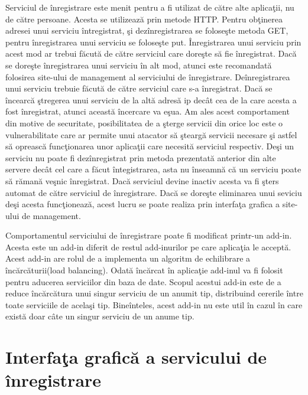 \documentclass[a4paper,12pt]{report}
\begin{document}
Serviciul de \^inregistrare este menit pentru a fi utilizat de c\u atre alte aplica\c tii, nu de c\u atre persoane.
Acesta se utilizeaz\u a prin metode HTTP. Pentru ob\c tinerea adresei unui serviciu \^intregistrat, \c si dez\^inregistrarea
 se folose\c ste metoda GET, pentru \^inregistrarea unui serviciu se folose\c ste put.
\^Inregistrarea unui serviciu prin acest mod ar trebui f\u acut\u a de c\u atre serviciul care dore\c ste 
s\u a fie \^inregistrat. Dac\u a se dore\c ste \^inregistrarea unui serviciu \^in alt mod, atunci este recomandat\u a 
folosirea site-ului de management al serviciului de \^inregistrare.
De\^inregistrarea unui serviciu trebuie f\u acut\u a de c\u atre serviciul care s-a \^inregistrat. Dac\u a 
se \^incearc\u a \c stregerea unui serviciu de la alt\u a adres\u a ip dec\^at cea de la care acesta a fost \^inregistrat,
atunci aceast\u a \^incercare va e\c sua. Am ales acest comportament din motive de securitate, posibilitatea de 
a \c sterge servicii din orice loc este o vulnerabilitate care ar permite unui atacator s\u a \c stearg\u a 
servicii necesare \c si astfel s\u a opreasc\u a func\c tionarea unor aplica\c tii care necesit\u a serviciul respectiv.
De\c si un serviciu nu poate fi dez\^inregistrat prin metoda prezentat\u a anterior din alte servere dec\^at cel care a 
f\u acut \^integistrarea, asta nu \^inseamn\u a c\u a un serviciu poate s\u a r\u aman\u a ve\c snic \^inregistrat.
Dac\u a serviciul devine inactiv acesta va fi \c sters automat de c\u atre serviciul de \^inregistrare.
Dac\u a se dore\c ste eliminarea unui seviciu de\c si acesta func\c tioneaz\u a, acest lucru se poate realiza prin 
interfa\c ta grafica a site-ului de management.  

Comportamentul serviciului de \^inregistrare poate fi modificat printr-un add-in.
Acesta este un add-in diferit de restul add-inurilor pe care aplica\c tia le accept\u a.
Acest add-in are rolul de a implementa un algoritm de echilibrare a \^inc\u arc\u aturii(load balancing).
Odat\u a \^inc\u arcat \^in aplica\c tie add-inul va fi folosit pentru aducerea serviciilor din
baza de date. Scopul acestui add-in este de a reduce \^inc\u arc\u atura unui singur 
serviciu de un anumit tip, distribuind cererile \^intre toate serviciile de acela\c si tip.
Bine\^inteles, acest add-in nu este util \^in cazul \^in care exist\u a doar c\^ate un singur 
serviciu de un anume tip.

\section{Interfa\c ta grafic\u a a servicului de \^inregistrare}
\end{document}
